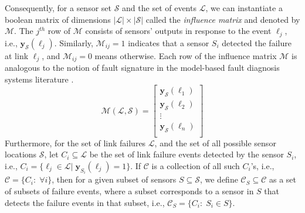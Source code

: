 \documentclass[twocolumn]{autart}
\begin{document}
Consequently, for a sensor set $\mathcal{S}$ and the set of events $\mathcal{L}$, we can instantiate a boolean matrix of dimensions $\lvert \mathcal{L} \rvert\times \lvert {\mathcal{S}} \rvert$ called the \textit{influence matrix} and denoted by $\mathcal{M}$. The $j^{th}$ row of $\mathcal{M}$ consists of sensors' outputs in response to the event $\ell_j$, i.e., $\mathbf{y}_\mathcal{S}(\ell_j)$. Similarly, $\mathcal{M}_{ij}=1$ indicates that a sensor $S_i$ detected the failure at link $\ell_j$, and $\mathcal{M}_{ij}=0$ means otherwise. Each row of the influence matrix $\mathcal{M}$ is analogous to the notion of fault signature in the model-based fault diagnosis systems literature \cite{1335513}. 
\vspace{-0.25cm}
\begin{equation}
\label{eq:sensing_model}
\mathcal{M}\left(\mathcal{L},{\mathcal{S}}\right) =
\left[
\begin{array}{c}
\mathbf{y}_{{\mathcal{S}}}(\ell_1)\\
\mathbf{y}_{\mathcal{S}}(\ell_2)\\
\vdots\\
\mathbf{y}_{\mathcal{S}}(\ell_n)\\
\end{array}
\right]
\end{equation}
Furthermore, for the set of link failures $\mathcal{L}$, and the set of all possible sensor locations $\mathcal{S}$, let $C_i\subseteq \mathcal{L}$ be the set of link failure events detected by the sensor $S_i$, i.e., $C_i=\{\ell_j\in\mathcal{L}| \; \mathbf{y}_{S_i}(\ell_j)=1\}$. If $\mathcal{C}$ is a collection of all such $C_i$'s, i.e., $\mathcal{C}=\{C_i:\;\forall i\}$, then for a given subset of sensors $S\subseteq\mathcal{S}$, we define $\mathcal{C}_S\subseteq \mathcal{C}$ as a set of subsets of failure events, where a subset corresponds to a sensor in $S$ that detects the failure events in that subset, i.e., $\mathcal{C}_S=\{C_i:\; S_i\in S\}$. \vspace{-0.25cm}
\end{document}
